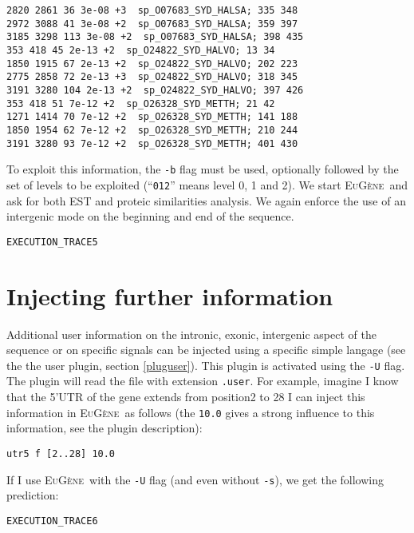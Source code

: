 \documentclass[a4paper,titlepage]{report}
\newcommand{\EuGenie}{\textsc{EuG\`ene}}
\begin{document}
\begin{Verbatim}[fontsize=\scriptsize]
2820 2861 36 3e-08 +3  sp_O07683_SYD_HALSA; 335 348
2972 3088 41 3e-08 +2  sp_O07683_SYD_HALSA; 359 397
3185 3298 113 3e-08 +2  sp_O07683_SYD_HALSA; 398 435
353 418 45 2e-13 +2  sp_O24822_SYD_HALVO; 13 34
1850 1915 67 2e-13 +2  sp_O24822_SYD_HALVO; 202 223
2775 2858 72 2e-13 +3  sp_O24822_SYD_HALVO; 318 345
3191 3280 104 2e-13 +2  sp_O24822_SYD_HALVO; 397 426
353 418 51 7e-12 +2  sp_O26328_SYD_METTH; 21 42
1271 1414 70 7e-12 +2  sp_O26328_SYD_METTH; 141 188
1850 1954 62 7e-12 +2  sp_O26328_SYD_METTH; 210 244
3191 3280 93 7e-12 +2  sp_O26328_SYD_METTH; 401 430
\end{Verbatim}

To exploit this information, the \texttt{-b} flag must be used,
optionally followed by the set of levels to be exploited
(``\texttt{012}'' means level 0, 1 and 2).  We start \EuGenie\ and ask
for both EST and proteic similarities analysis. We again enforce the
use of an intergenic mode on the beginning and end of the sequence.

\begin{Verbatim}[fontsize=\scriptsize]
EXECUTION_TRACE5
\end{Verbatim}

\section{Injecting further information}

Additional user information on the intronic, exonic, intergenic aspect
of the sequence or on specific signals can be injected using a
specific simple langage (see the the user plugin,
section \ref{pluguser}). This plugin is activated using the
\texttt{-U} flag. The plugin will read the file with extension
\texttt{.user}. For example, imagine I know that the 5'UTR of the gene
extends from position2 to 28 I can inject this information in
\EuGenie\ as follows (the \texttt{10.0} gives a strong influence to
this information, see the plugin description):

\begin{Verbatim}[fontsize=\scriptsize]
utr5 f [2..28] 10.0
\end{Verbatim} 

If I use \EuGenie\ with the \texttt{-U} flag (and even without
\texttt{-s}), we get the following prediction:

\begin{Verbatim}[fontsize=\scriptsize]
EXECUTION_TRACE6
\end{Verbatim} 
\end{document}
